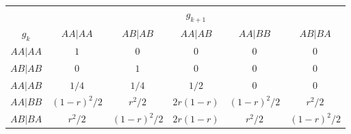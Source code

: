 \begin{center}
{\renewcommand{\arraystretch}{1.5}\begin{tabular}{cccccc} \hline
& \multicolumn{5}{c}{$g_{k+1}$} \\ \cline{2-6}
$g_k$ & $AA|AA$ & $AB|AB$ & $AA|AB$ & $AA|BB$ & $AB|BA$  \\ \hline 
$AA|AA$ & $1$ & $0$ & $0$ & $0$ & $0$ \\ 
$AB|AB$ & $0$ & $1$ & $0$ & $0$ & $0$ \\ 
$AA|AB$ & $1/4$ & $1/4$ & $1/2$ & $0$ & $0$ \\ 
$AA|BB$ & $(1-r)^2/2$ & $r^2/2$ & $2r(1-r)$ & $(1-r)^2/2$ & $r^2/2$ \\ 
$AB|BA$ & $r^2/2$ & $(1-r)^2/2$ & $2r(1-r)$ & $r^2/2$ & $(1-r)^2/2$ \\ 
\hline
\end{tabular} }
\end{center}

